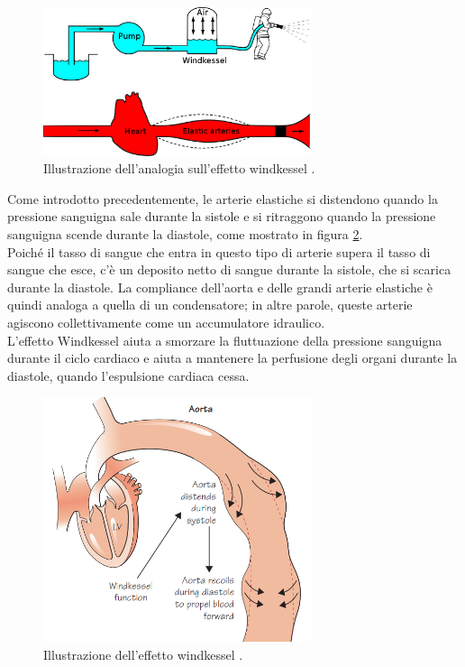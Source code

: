\begin{figure}[h]
    \centering
    \includegraphics[width=0.7\textwidth]{images/Windkessel/WindkesselEffect.png}
    \caption{Illustrazione dell'analogia sull'effetto windkessel \cite{wiki:WindkesselEffect}.}
    \label{windkesselEffect}
\end{figure}

\newpage
Come introdotto precedentemente, le arterie elastiche si distendono quando la pressione sanguigna sale durante la sistole e si ritraggono quando la pressione sanguigna scende durante la diastole, come mostrato in figura \ref{windkesselEffect(libro)}. \\
Poiché il tasso di sangue che entra in questo tipo di arterie supera il tasso di sangue che esce, c'è un deposito netto di sangue durante la sistole, che si scarica durante la diastole. La compliance dell'aorta e delle grandi arterie elastiche è quindi analoga a quella di un condensatore; in altre parole, queste arterie agiscono collettivamente come un accumulatore idraulico.\\
L'effetto Windkessel aiuta a smorzare la fluttuazione della pressione sanguigna durante il ciclo cardiaco e aiuta a mantenere la perfusione degli organi durante la diastole, quando l'espulsione cardiaca cessa. 


\begin{figure}[h]
    \centering
    \includegraphics[width=0.7\textwidth]{images/Windkessel/WindkesselEffect(libro).PNG}
    \caption{Illustrazione dell'effetto windkessel  \cite{AaronsonPhilipI.PhilipIrving2020Tcsa}.}
    \label{windkesselEffect(libro)}
\end{figure}

